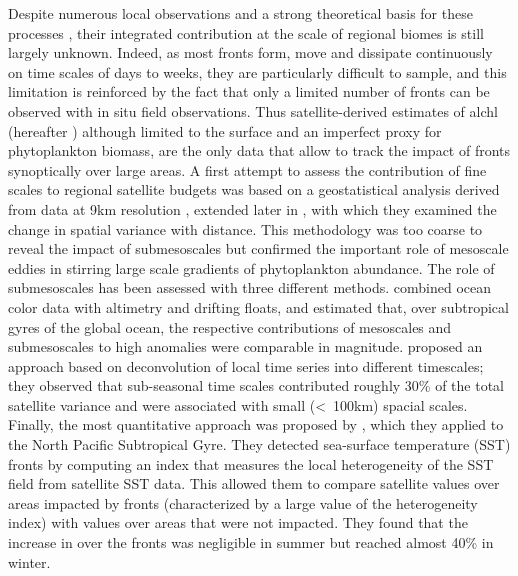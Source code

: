 Despite numerous local observations and a strong theoretical basis for these processes \citep[e.g. recent studies by][]{marrec_2018, little_2018, verneil_2019, ruiz_2019, uchida_2020, kessouri_2020, tzortzis_2021}, their integrated contribution at the scale of regional biomes is still largely unknown.
Indeed, as most fronts form, move and dissipate continuously on time scales of days to weeks, they are particularly difficult to sample, and this limitation is reinforced by the fact that only a limited number of fronts can be observed with in situ field observations.
Thus satellite-derived estimates of al{chl} (hereafter ) although limited to the surface and an imperfect proxy for phytoplankton biomass, are the only data that allow to track the impact of fronts synoptically over large areas.
A first attempt to assess the contribution of fine scales to regional satellite  budgets was based on a geostatistical analysis derived from data at 9km resolution \citep{doney_2003}, extended later in \citet{glover_2018}, with which they examined the change in spatial variance with distance.
This methodology was too coarse to reveal the impact of submesoscales but confirmed the important role of mesoscale eddies in stirring large scale gradients of phytoplankton abundance.
The role of submesoscales has been assessed with three different methods.
\citet{guo_2019} combined ocean color data with altimetry and drifting floats, and estimated that, over subtropical gyres of the global ocean, the respective contributions of mesoscales and submesoscales to high  anomalies were comparable in magnitude.
\citet{keerthi_2022} proposed an approach based on deconvolution of local  time series into different timescales; they observed that sub-seasonal time scales contributed roughly 30\% of the total satellite  variance and were associated with small (\textless\ 100km) spacial scales.
Finally, the most quantitative approach was proposed by \citet{liu_2016}, which they applied to the North Pacific Subtropical Gyre.
They detected sea-surface temperature (SST) fronts by computing an index that measures the local heterogeneity of the SST field from satellite SST data.
This allowed them to compare satellite  values over areas impacted by fronts (characterized by a large value of the heterogeneity index) with values over areas that were not impacted.
They found that the increase in  over the fronts was negligible in summer but reached almost 40\% in winter.

